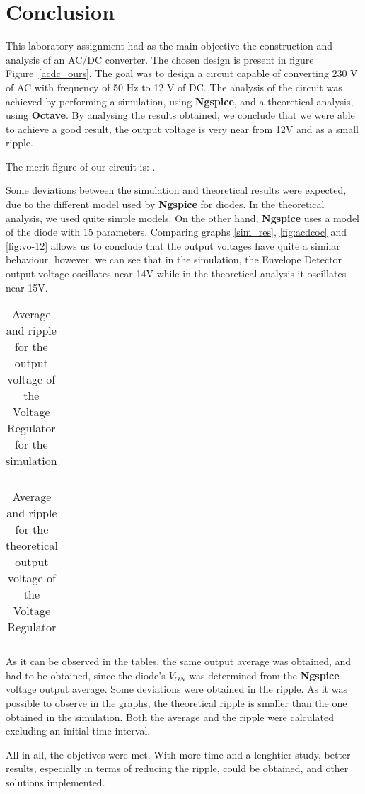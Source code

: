 \section{Conclusion}
\label{sec:conclusion}

This laboratory assignment had as the main objective the construction and analysis of an AC/DC converter. The chosen design is present in figure Figure~\ref{acdc_ours}. The goal was to design a circuit capable of converting 230 V of AC with frequency of 50 Hz to 12 V of DC. The analysis of the circuit was achieved by performing a simulation, using {\bf Ngspice}, and a theoretical analysis, using {\bf Octave}. By analysing the results obtained, we conclude that we were able to achieve a good result, the output voltage is very near from 12V and as a small ripple. 

The merit figure of our circuit is: .

Some deviations between the simulation and theoretical results were expected, due to the different model used by {\bf Ngspice} for diodes. In the theoretical analysis, we used quite simple models. On the other hand, {\bf Ngspice} uses a model of the diode with 15 parameters. Comparing graphs \ref{sim_res}, \ref{fig:acdcoc} and \ref{fig:vo-12} allows us to conclude that the output voltages have quite a similar behaviour, however, we can see that in the simulation, the Envelope Detector output voltage oscillates near 14V while in the theoretical analysis it oscillates near 15V. 

\begin{table}[H]
  \centering
  \begin{tabular}{|c|c|}
    \hline
        
        \hline
  \end{tabular}
  \caption{Average and ripple for the output voltage of the Voltage Regulator for the simulation}
  \label{tab:acdcsim}
\end{table}

\begin{table}[H]
  \centering
  \begin{tabular}{|c|c|}
    \hline
        
        \hline
  \end{tabular}
  \caption{Average and ripple for the theoretical output voltage of the Voltage Regulator}
  \label{tab:acdcoc}
\end{table}

As it can be observed in the tables, the same output average was obtained, and had to be obtained, since the diode's $V_{ON}$ was determined from the {\bf Ngspice} voltage output average. Some deviations were obtained in the ripple. As it was possible to observe in the graphs, the theoretical ripple is smaller than the one obtained in the simulation. Both the average and the ripple were calculated excluding an initial time interval.

All in all, the objetives were met. With more time and a lenghtier study, better results, especially in terms of reducing the ripple, could be obtained, and other solutions implemented.
